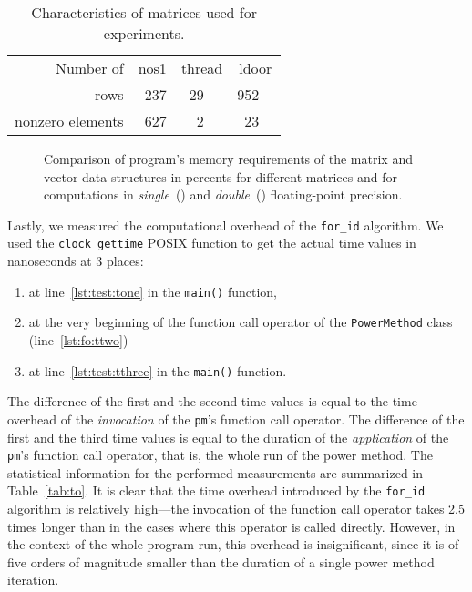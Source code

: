 \documentclass[10pt,a4paper]{article}
\theoremstyle{definition}\newtheorem{problem}{Problem}
\providecommand{\forid}{\texttt{for\_id}\xspace}
\begin{document}
\renewcommand{\arraystretch}{1.00}
\renewcommand{\tabcolsep}{3mm}
\begin{table}[t]
\caption{Characteristics of matrices used for experiments.}
\begin{center}
\begin{tabular}{rr *{2}{r@{.}l}}
\toprule
Number of & nos1 & \multicolumn{2}{c}{thread} & \multicolumn{2}{c}{ldoor} \\ \cmidrule(r){1-1} \cmidrule(l){2-6}
rows & 237 & 29 &  & 952 &  \rule[0.0em]{0pt}{1.15em} \\
nonzero elements & 627 & 2 &  & 23 &  \\
\bottomrule
\end{tabular}
\end{center}
\label{tab:mats}
\end{table}

\begin{figure}[t]
\centering
{}
\hspace{4mm}
\caption{Comparison of program's memory requirements of the matrix and vector data structures in percents for different matrices and for computations in \emph{single}~(\protect{}) and \emph{double}~(\protect{}) floating-point precision. }
\label{fig:mr}
\end{figure}

Lastly, we measured the computational overhead of the \forid algorithm. We used the \texttt{clock\_gettime} POSIX function to get the actual time values in nanoseconds at 3 places:
\begin{enumerate}

\item at line~\ref{lst:test:tone} in the \texttt{main()} function,

\item at the very beginning of the function call operator of the \texttt{PowerMethod} class (line~\ref{lst:fo:ttwo})

\item at line~\ref{lst:test:tthree} in the \texttt{main()} function.

\end{enumerate}
The difference of the first and the second time values is equal to the time overhead of the \emph{invocation} of the \texttt{pm}'s function call operator. The difference of the first and the third time values is equal to the duration of the \emph{application} of the \texttt{pm}'s function call operator, that is, the whole run of the power method. The statistical information for the performed measurements are summarized in Table~\ref{tab:to}. It is clear that the time overhead introduced by the \forid algorithm is relatively high---the invocation of the function call operator takes 2.5 times longer than in the cases where this operator is called directly. However, in the context of the whole program run, this overhead is insignificant, since it is of five orders of magnitude smaller than the duration of a single power method iteration.
\end{document}
